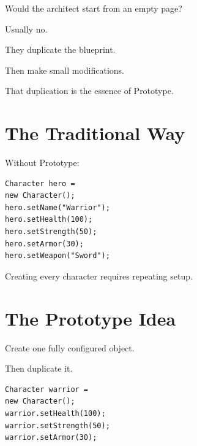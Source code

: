 \documentclass[11pt,a4paper]{book}
\begin{document}
Would the architect start from
an empty page?


Usually no.


They duplicate the blueprint.


Then make small modifications.


That duplication is the essence
of Prototype.


\section{The Traditional Way}

Without Prototype:

\begin{verbatim}
Character hero =
new Character();
hero.setName("Warrior");
hero.setHealth(100);
hero.setStrength(50);
hero.setArmor(30);
hero.setWeapon("Sword");
\end{verbatim}


Creating every character
requires repeating setup.


\section{The Prototype Idea}

Create one fully configured
object.


Then duplicate it.


\begin{verbatim}
Character warrior =
new Character();
warrior.setHealth(100);
warrior.setStrength(50);
warrior.setArmor(30);
\end{verbatim}
\end{document}
